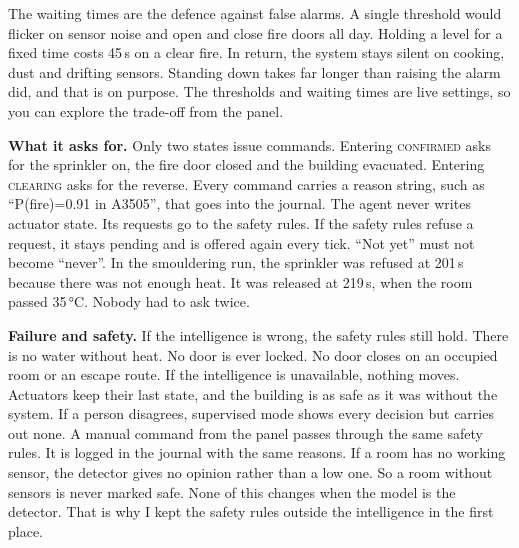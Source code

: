 The waiting times are the defence against false alarms. A single threshold would
flicker on sensor noise and open and close fire doors all day. Holding a level for
a fixed time costs 45\,s on a clear fire. In return, the system stays silent on
cooking, dust and drifting sensors. Standing down takes far longer than raising the
alarm did, and that is on purpose. The thresholds and waiting times are live
settings, so you can explore the trade-off from the panel.

\textbf{What it asks for.} Only two states issue commands. Entering
\textsc{confirmed} asks for the sprinkler on, the fire door closed and the building
evacuated. Entering \textsc{clearing} asks for the reverse. Every command carries a
reason string, such as ``P(fire)=0.91 in A3505'', that goes into the journal. The
agent never writes actuator state. Its requests go to the safety rules. If the
safety rules refuse a request, it stays pending and is offered again every tick.
``Not yet'' must not become ``never''. In the smouldering run, the sprinkler was
refused at 201\,s because there was not enough heat. It was released at 219\,s,
when the room passed 35\,°C. Nobody had to ask twice.

\textbf{Failure and safety.} If the intelligence is wrong, the safety rules still
hold. There is no water without heat. No door is ever locked. No door closes on an
occupied room or an escape route. If the intelligence is unavailable, nothing
moves. Actuators keep their last state, and the building is as safe as it was
without the system. If a person disagrees, supervised mode shows every decision but
carries out none. A manual command from the panel passes through the same safety
rules. It is logged in the journal with the same reasons. If a room has no working
sensor, the detector gives no opinion rather than a low one. So a room without
sensors is never marked safe. None of this changes when the model is the detector.
That is why I kept the safety rules outside the intelligence in the first place.

